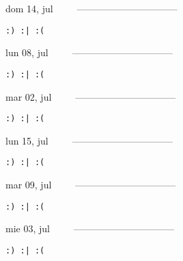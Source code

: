 \documentclass[letterpaper,10pt]{article}
\begin{document}
\begin{multicols}{3}
{dom 14, jul\ \ \ \ \ --------------------------------}
\begin{flushright}\begin{small}\texttt{:) :| :(}\end{small}\end{flushright}
\vfill
{lun 08, jul\ \ \ \ \ --------------------------------}
\begin{flushright}\begin{small}\texttt{:) :| :(}\end{small}\end{flushright}\par
\vfill
{mar 02, jul\ \ \ \ \ --------------------------------}
\begin{flushright}\begin{small}\texttt{:) :| :(}\end{small}\end{flushright}\par
\vfill
\end{multicols}
\vspace{1.05cm}

\begin{multicols}{3}
{lun 15, jul\ \ \ \ \ --------------------------------}
\begin{flushright}\begin{small}\texttt{:) :| :(}\end{small}\end{flushright}
\vfill
{mar 09, jul\ \ \ \ \ --------------------------------}
\begin{flushright}\begin{small}\texttt{:) :| :(}\end{small}\end{flushright}\par
\vfill
{mie 03, jul\ \ \ \ \ --------------------------------}
\begin{flushright}\begin{small}\texttt{:) :| :(}\end{small}\end{flushright}\par
\vfill
\end{multicols}
\vspace{1.05cm}
\end{document}
